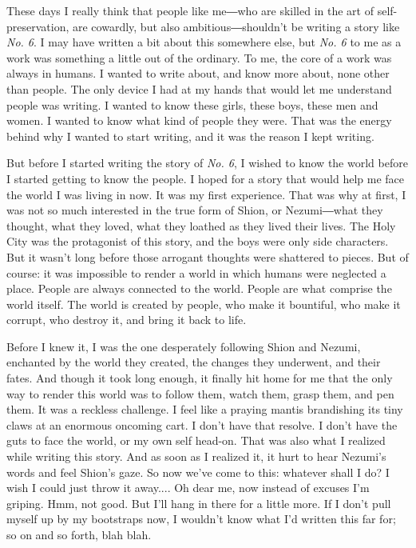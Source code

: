 These days I really think that people like me―who are skilled in the art
of self-preservation, are cowardly, but also ambitious―shouldn't be
writing a story like \emph{No. 6}. I may have written a bit about this
somewhere else, but \emph{No. 6} to me as a work was something a little out of
the ordinary. To me, the core of a work was always in humans. I wanted
to write about, and know more about, none other than people. The only
device I had at my hands that would let me understand people was
writing. I wanted to know these girls, these boys, these men and women.
I wanted to know what kind of people they were. That was the energy
behind why I wanted to start writing, and it was the reason I kept
writing.

But before I started writing the story of \emph{No. 6}, I wished to know the
world before I started getting to know the people. I hoped for a story
that would help me face the world I was living in now. It was my first
experience. That was why at first, I was not so much interested in the
true form of Shion, or Nezumi―what they thought, what they loved, what
they loathed as they lived their lives. The Holy City was the
protagonist of this story, and the boys were only side characters. But
it wasn't long before those arrogant thoughts were shattered to pieces.
But of course: it was impossible to render a world in which humans were
neglected a place. People are always connected to the world. People are
what comprise the world itself. The world is created by people, who make
it bountiful, who make it corrupt, who destroy it, and bring it back to
life.

Before I knew it, I was the one desperately following Shion and Nezumi,
enchanted by the world they created, the changes they underwent, and
their fates. And though it took long enough, it finally hit home for me
that the only way to render this world was to follow them, watch them,
grasp them, and pen them. It was a reckless challenge. I feel like a
praying mantis brandishing its tiny claws at an enormous oncoming cart.
I don't have that resolve. I don't have the guts to face the world, or
my own self head-on. That was also what I realized while writing this
story. And as soon as I realized it, it hurt to hear Nezumi's words and
feel Shion's gaze. So now we've come to this: whatever shall I do? I
wish I could just throw it away.... Oh dear me, now instead of excuses
I'm griping. Hmm, not good. But I'll hang in there for a little more. If
I don't pull myself up by my bootstraps now, I wouldn't know what I'd
written this far for; so on and so forth, blah blah.

